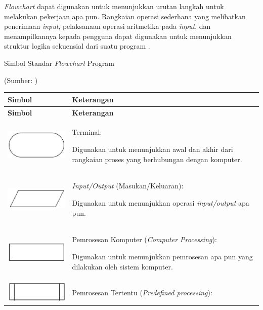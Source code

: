 \emph{Flowchart} dapat digunakan untuk menunjukkan urutan langkah
untuk melakukan pekerjaan apa pun. Rangkaian operasi sederhana yang
melibatkan penerimaan \emph{input}, pelaksanaan operasi aritmetika
pada \emph{input}, dan menampilkannya kepada pengguna dapat digunakan
untuk menunjukkan struktur logika sekuensial dari suatu program \citep{chaudhuri2020flowchart}.

\begin{table}[H]
\caption{Simbol Standar \emph{Flowchart} Program}

\centering{}(Sumber: \citealp{chaudhuri2020flowchart})
\end{table}

\vspace{-25pt}

\begin{longtable}[c]{|>{\centering}m{4cm}|>{\raggedright}m{9.5cm}|}
\hline 
\textbf{Simbol} & \centering{}\textbf{Keterangan}\tabularnewline
\hline 
\endfirsthead
\hline 
\textbf{Simbol} & \centering{}\textbf{Keterangan}\tabularnewline
\hline 
\endhead
\hline 
\includegraphics[totalheight=1.3cm]{images/flow_terminal} & Terminal:

Digunakan untuk menunjukkan awal dan akhir dari rangkaian proses yang
berhubungan dengan komputer.\tabularnewline
\hline 
\includegraphics[totalheight=1cm]{images/flow_io} & \emph{Input/Output} (Masukan/Keluaran):

Digunakan untuk menunjukkan operasi \emph{input/output} apa pun.\tabularnewline
\hline 
\includegraphics[totalheight=1cm]{images/flow_proc} & Pemrosesan Komputer (\emph{Computer Processing}):

Digunakan untuk menunjukkan pemrosesan apa pun yang dilakukan oleh
sistem komputer.\tabularnewline
\hline 
\includegraphics[totalheight=1cm]{images/flow_predproc} & Pemrosesan Tertentu (\emph{Predefined processing}):


\end{longtable}
